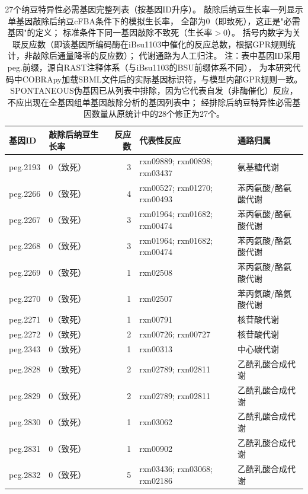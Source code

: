\documentclass[10pt, a4paper, twocolumn]{ctexart}
\begin{document}
\begin{table}[htbp]
\caption{27个纳豆特异性必需基因完整列表（按基因ID升序）。
  敲除后纳豆生长率一列显示单基因敲除后纳豆cFBA条件下的模拟生长率，
  全部为0（即致死），这正是"必需基因"的定义；
  标准条件下同一基因敲除不致死（生长率$>$0）。
  括号内数字为关联反应数（即该基因所编码酶在iBsu1103中催化的反应总数，根据GPR规则统计，非敲除后通量降零的反应数）；
  代谢通路为人工归注。
  注：表中基因ID采用peg.前缀，源自RAST注释体系（与iBsu1103的BSU前缀体系不同），
  为本研究代码中COBRApy加载SBML文件后的实际基因标识符，与模型内部GPR规则一致。
  SPONTANEOUS伪基因已从列表中排除，因为它代表自发（非酶催化）反应，
  不应出现在全基因组单基因敲除分析的基因列表中；
  经排除后纳豆特异性必需基因数量从原统计中的28个修正为27个。}
\label{tab:spec_genes}
\small
\centering
\begin{tabular}{llrp{4.5cm}p{5cm}}
\toprule
\textbf{基因ID} & \textbf{敲除后纳豆生长率} & \textbf{反应数} & \textbf{代表性反应} & \textbf{通路归属} \\
\midrule
peg.2193     & 0（致死） &  3 & rxn09889; rxn00898; rxn03437 & 氨基糖代谢 \\
peg.2266     & 0（致死） &  4 & rxn00527; rxn01270; rxn00493 & 苯丙氨酸/酪氨酸代谢 \\
peg.2267     & 0（致死） &  3 & rxn01964; rxn01682; rxn00474 & 苯丙氨酸/酪氨酸代谢 \\
peg.2268     & 0（致死） &  3 & rxn01964; rxn01682; rxn00474 & 苯丙氨酸/酪氨酸代谢 \\
peg.2269     & 0（致死） &  1 & rxn02508 & 苯丙氨酸/酪氨酸代谢 \\
peg.2270     & 0（致死） &  1 & rxn02507 & 苯丙氨酸/酪氨酸代谢 \\
peg.2271     & 0（致死） &  1 & rxn00791 & 核苷酸代谢 \\
peg.2272     & 0（致死） &  2 & rxn00726; rxn00727 & 核苷酸代谢 \\
peg.2343     & 0（致死） &  1 & rxn00313 & 中心碳代谢 \\
peg.2828     & 0（致死） &  2 & rxn02789; rxn02811 & 乙酰乳酸合成代谢 \\
peg.2829     & 0（致死） &  2 & rxn02789; rxn02811 & 乙酰乳酸合成代谢 \\
peg.2830     & 0（致死） &  1 & rxn03062 & 乙酰乳酸合成代谢 \\
peg.2831     & 0（致死） &  1 & rxn00902 & 乙酰乳酸合成代谢 \\
peg.2832     & 0（致死） &  5 & rxn03436; rxn03068; rxn02186 & 乙酰乳酸合成代谢 \\

\end{tabular}
\end{table}
\end{document}
